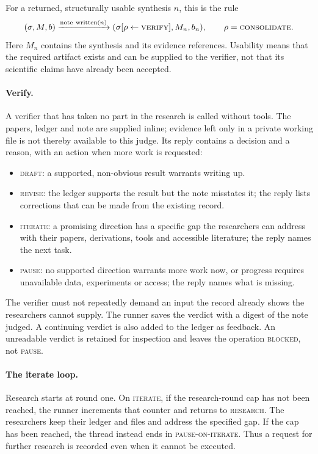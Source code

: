 \documentclass[11pt,a4paper]{article}
\newcommand{\st}[1]{\textsc{#1}}
\begin{document}
For a returned, structurally usable synthesis \(n\), this is the rule
\[
 (\sigma,M,b)\xrightarrow{\mathrm{note\ written}(n)}
 (\sigma[\rho\leftarrow\st{verify}],M_n,b_n),
 \qquad\rho=\st{consolidate}.
\]
Here \(M_n\) contains the synthesis and its evidence references. Usability means
that the required artifact exists and can be supplied to the verifier, not that
its scientific claims have already been accepted.

\paragraph{Verify.}
A verifier that has taken no part in the research is called without tools. The
papers, ledger and note are supplied inline; evidence left only in a private
working file is not thereby available to this judge. Its reply contains a
decision and a reason, with an action when more work is requested:
\begin{itemize}
\item \st{draft}: a supported, non-obvious result warrants writing up.
\item \st{revise}: the ledger supports the result but the note misstates it; the
reply lists corrections that can be made from the existing record.
\item \st{iterate}: a promising direction has a specific gap the researchers can
address with their papers, derivations, tools and accessible literature; the
reply names the next task.
\item \st{pause}: no supported direction warrants more work now, or progress
requires unavailable data, experiments or access; the reply names what is
missing.
\end{itemize}
The verifier must not repeatedly demand an input the record already shows the
researchers cannot supply. The runner saves the verdict with a digest of the
note judged. A continuing verdict is also added to the ledger as feedback. An
unreadable verdict is retained for inspection and leaves the operation
\st{blocked}, not \st{pause}.

\paragraph{The iterate loop.}
Research starts at round one. On \st{iterate}, if the research-round cap has not
been reached, the runner increments that counter and returns to \st{research}.
The researchers keep their ledger and files and address the specified gap. If
the cap has been reached, the thread instead ends in \st{pause-on-iterate}. Thus
a request for further research is recorded even when it cannot be executed.
\end{document}
